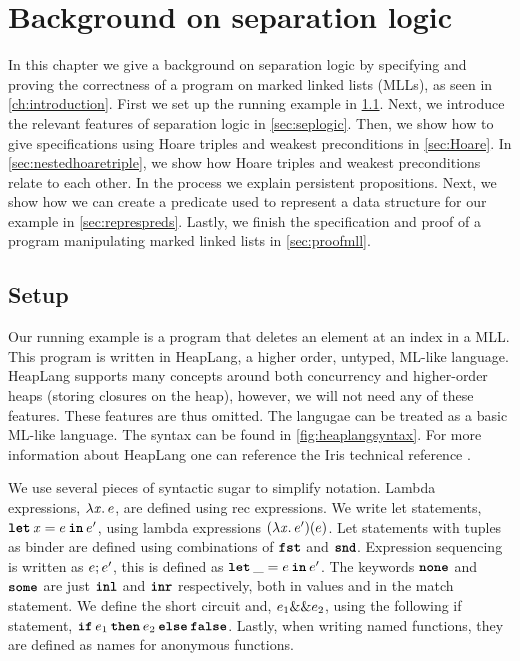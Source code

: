 \documentclass[thesis.tex]{subfiles}
\begin{document}
\chapter{Background on separation logic}
\label{ch:backgroundseplogic}

In this chapter we give a background on separation logic by specifying and proving the correctness of a program on marked linked lists (MLLs), as seen in \cref*{ch:introduction}. First we set up the running example in \cref*{sec:irissetup}. Next, we introduce the relevant features of separation logic in \cref*{sec:seplogic}. Then, we show how to give specifications using Hoare triples and weakest preconditions in \cref*{sec:Hoare}. In \cref*{sec:nestedhoaretriple}, we show how Hoare triples and weakest preconditions relate to each other. In the process we explain persistent propositions. Next, we show how we can create a predicate used to represent a data structure for our example in \cref*{sec:represpreds}. Lastly, we finish the specification and proof of a program manipulating marked linked lists in \cref*{sec:proofmll}.

\section{Setup}
\label{sec:irissetup}
Our running example is a program that deletes an element at an index in a MLL. This program is written in HeapLang, a higher order, untyped, ML-like language. HeapLang supports many concepts around both concurrency and higher-order heaps (storing closures on the heap), however, we will not need any of these features. These features are thus omitted. The langugae can be treated as a basic ML-like language. The syntax can be found in \cref*{fig:heaplangsyntax}. For more information about HeapLang one can reference the Iris technical reference \cite*{iristeamIrisReference2023}.

We use several pieces of syntactic sugar to simplify notation. Lambda expressions, $\Lam \lvar. \expr$, are defined using rec expressions. We write let statements, $\Let \lvar = \expr in \expr'$, using lambda expressions $(\Lam \lvar. \expr')(\expr)$. Let statements with tuples as binder are defined using combinations of $\operatorname{\texttt{\upshape \bfseries fst}}$ and $\operatorname{\texttt{\upshape \bfseries snd}}$. Expression sequencing is written as $e; e'$, this is defined as $\Let \_ = \expr in \expr'$. The keywords $\operatorname{\texttt{\upshape \bfseries none}}$ and $\operatorname{\texttt{\upshape \bfseries some}}$ are just $\operatorname{\texttt{\upshape \bfseries inl}}$ and $\operatorname{\texttt{\upshape \bfseries inr}}$ respectively, both in values and in the match statement. We define the short circuit and, $e_1 \&\& e_2$, using the following if statement, $\If \expr_1 then \expr_2 \Else \False$. Lastly, when writing named functions, they are defined as names for anonymous functions.
\end{document}
